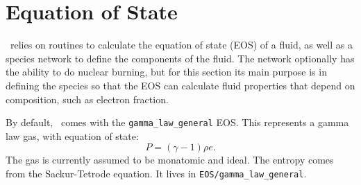 \section{Equation of State}

\castro\ relies on routines to calculate the equation of state (EOS) 
of a fluid, as well as a species network to define the components of 
the fluid. The network optionally has the ability to do nuclear burning, 
but for this section its main purpose is in defining the species so that 
the EOS can calculate fluid properties that depend on composition, such 
as electron fraction.

By default, \castro\ comes with the {\tt gamma\_law\_general}
EOS. This represents a gamma law gas, with equation of state:
\begin{equation}
  P = (\gamma - 1) \rho e.
\end{equation}
The gas is currently assumed to be monatomic and ideal. The entropy comes from the Sackur-Tetrode equation. 
It lives in {\tt EOS/gamma\_law\_general}.


